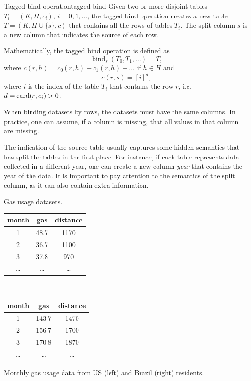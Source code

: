 \begin{defbox}{Tagged bind operation}{tagged-bind}
  Given two or more disjoint tables $T_i = (K, H, c_i)$, $i = 0, 1, \dots$, the tagged
  bind operation creates a new table $T = (K, H \cup \{s\}, c)$ that contains all the rows
  of tables $T_i$.  The split column $s$ is a new column that indicates the source of each
  row.

  Mathematically, the tagged bind operation is defined as \[
    \operatorname{bind}_{s}(T_0, T_1, \dots) = T\text{,}
  \] where $c(r, h) = c_0(r, h) + c_1(r, h) + \dots$ if $h \in H$ and \[
    c(r, s) = \left[ i \right]^{d} \text{,}
  \]
  where $i$ is the index of the table $T_i$ that contains the row $r$, i.e. $d =
  \rowcard[r; c_i] > 0$.
\end{defbox}

When binding datasets by rows, the datasets must have the same columns.  In practice,
one can assume, if a column is missing, that all values in that column are missing.

The indication of the source table usually captures some hidden semantics that has split
the tables in the first place. For instance, if each table represents data collected in a
different year, one can create a new column \emph{year} that contains the year of the
data.  It is important to pay attention to the semantics of the split column, as it can
also contain extra information.

\begin{tablebox}[label=tab:gas-usage]{Gas usage datasets.}
  \centering
  \begin{tabular}{c|cc}
    \toprule
    \textbf{month} & \textbf{gas} & \textbf{distance} \\
    \midrule
    1 & 48.7 & 1170 \\
    2 & 36.7 & 1100 \\
    3 & 37.8 & 970 \\
    \dots & \dots & \dots \\
    \bottomrule
  \end{tabular}
  ~
  \begin{tabular}{c|cc}
    \toprule
    \textbf{month} & \textbf{gas} & \textbf{distance} \\
    \midrule
    1 & 143.7 & 1470 \\
    2 & 156.7 & 1700 \\
    3 & 170.8 & 1870 \\
    \dots & \dots & \dots \\
    \bottomrule
  \end{tabular}
  \tcblower
  Monthly gas usage data from US (left) and Brazil (right) residents.
\end{tablebox}

